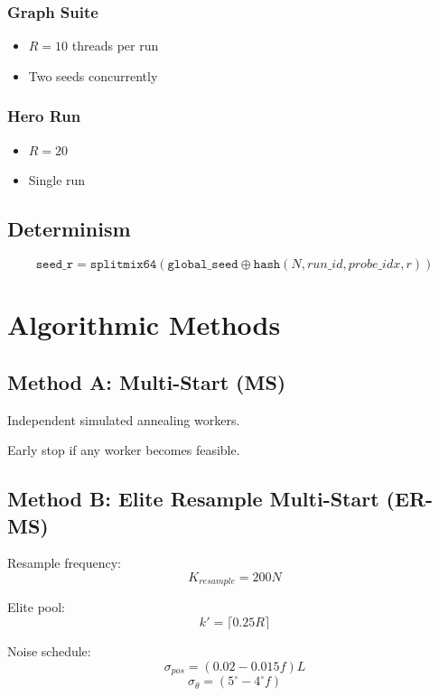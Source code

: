 \documentclass[11pt]{report}
\begin{document}
\subsection{Graph Suite}

\begin{itemize}
    \item $R = 10$ threads per run
    \item Two seeds concurrently
\end{itemize}

\subsection{Hero Run}

\begin{itemize}
    \item $R = 20$
    \item Single run
\end{itemize}

\section{Determinism}

\[
\texttt{seed\_r} =
\texttt{splitmix64}(
\texttt{global\_seed} \oplus
\texttt{hash}(N, run\_id, probe\_idx, r))
\]

\chapter{Algorithmic Methods}

\section{Method A: Multi-Start (MS)}

Independent simulated annealing workers.

Early stop if any worker becomes feasible.

\section{Method B: Elite Resample Multi-Start (ER-MS)}

Resample frequency:
\[
K_{resample} = 200N
\]

Elite pool:
\[
k' = \lceil 0.25R \rceil
\]

Noise schedule:
\[
\sigma_{pos} = (0.02 - 0.015f)L
\]
\[
\sigma_{\theta} = (5^\circ - 4^\circ f)
\]
\end{document}
